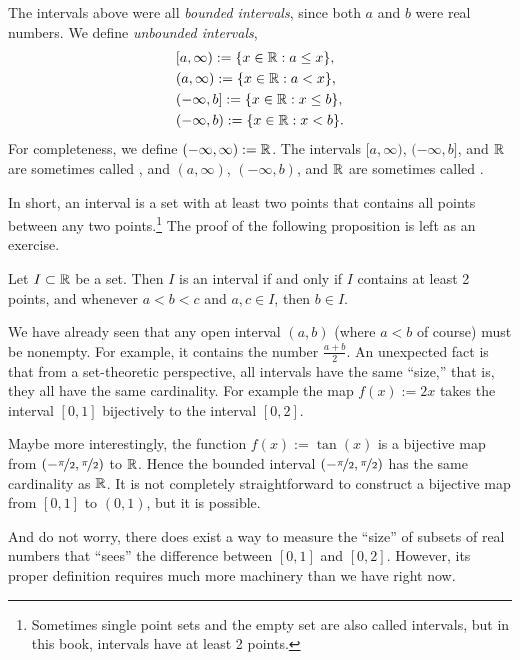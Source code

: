 The intervals above were all \emph{bounded intervals}, since both $a$ and $b$ were real numbers.  We 
define \emph{unbounded intervals},
\begin{align*}
& [a,\infty) := \{ x \in {\mathbb{R}} : a \leq x \}, \\
& (a,\infty) := \{ x \in {\mathbb{R}} : a < x \}, \\
& (-\infty,b] := \{ x \in {\mathbb{R}} : x \leq b \}, \\
& (-\infty,b) := \{ x \in {\mathbb{R}} : x < b \} .
\end{align*}
For completeness, we define $(-\infty,\infty) := {\mathbb{R}}$.
The intervals $[a,\infty)$, $(-\infty,b]$, and ${\mathbb{R}}$ are sometimes called
\emph{},
and $(a,\infty)$, $(-\infty,b)$, and ${\mathbb{R}}$ are sometimes called
\emph{}.

In short, an interval is a set with at least two points
that contains all points between any two
points.\footnote{Sometimes single point sets and the empty set are
also called intervals, but in this book, intervals have at least 2 points.}
The proof of the following proposition is left as an exercise.

\begin{prop} \label{prop:intervaldef}
Let $I \subset {\mathbb{R}}$ be a set.
Then $I$ is an interval if and only if
$I$ contains at least 2 points, and
whenever $a < b < c$ and $a, c \in I$, then $b \in I$.
\end{prop}

We have already seen that any open interval $(a,b)$ (where $a < b$ of course)
must be nonempty.  For example, it contains the number $\frac{a+b}{2}$.
An unexpected fact is that from a set-theoretic perspective,
all intervals have the same ``size,'' that is, they all have
the same cardinality.  For example the map $f(x) := 2x$
takes the interval $[0,1]$ bijectively to the interval $[0,2]$.

Maybe more interestingly,
the function $f(x) := \tan(x)$
is a bijective map from $(-\nicefrac{\pi}{2},\nicefrac{\pi}{2})$ to ${\mathbb{R}}$.  Hence the bounded
interval $(-\nicefrac{\pi}{2},\nicefrac{\pi}{2})$ has the same cardinality as ${\mathbb{R}}$.  It is not
completely straightforward to construct a bijective map from $[0,1]$ to
$(0,1)$, but it is possible.

And do not worry, there does exist a way to measure the ``size'' of subsets
of real numbers that
``sees''
the difference between $[0,1]$ and $[0,2]$.  However, its proper definition
requires much more machinery than we have right now.

